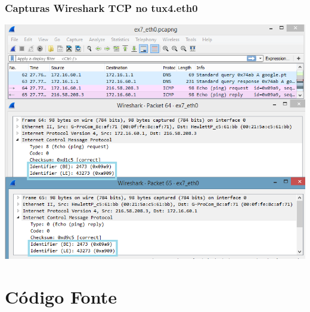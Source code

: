 \documentclass[11pt,a4paper,reqno]{report}
\numberwithin{equation}{section}
\begin{document}
\begin{appendices}
\subsection{Capturas Wireshark TCP no tux4.eth0}
\label{ex7_ping}
\includegraphics[width=16cm]{ex7_ping.png}

\chapter{Código Fonte}








\end{appendices}
\end{document}
